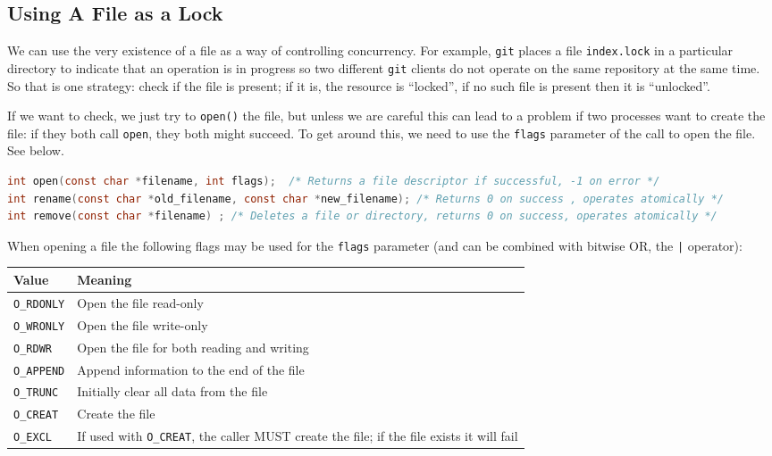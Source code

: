 \subsection*{Using A File as a Lock}

We can use the very existence of a file as a way of controlling concurrency. For example, \texttt{git} places a file \texttt{index.lock} in a particular directory to indicate that an operation is in progress so two different \texttt{git} clients do not operate on the same repository at the same time. So that is one strategy: check if the file is present; if it is, the resource is ``locked'', if no such file is present then it is ``unlocked''.

If we want to check, we just try to \texttt{open()} the file, but unless we are careful this can lead to a problem if two processes want to create the file: if they both call \texttt{open}, they both might succeed. To get around this, we need to use the \texttt{flags} parameter of the call to open the file. See below.

\begin{lstlisting}[language=C]
int open(const char *filename, int flags);  /* Returns a file descriptor if successful, -1 on error */
int rename(const char *old_filename, const char *new_filename); /* Returns 0 on success , operates atomically */
int remove(const char *filename) ; /* Deletes a file or directory, returns 0 on success, operates atomically */ 
\end{lstlisting}

When opening a file the following flags may be used for the \texttt{flags} parameter (and can be combined with bitwise OR, the \texttt{|} operator):

\begin{tabular}{l|l}
	\textbf{Value}     & \textbf{Meaning}                                                                                 \\ \hline
	\texttt{O\_RDONLY} & Open the file read-only                                                                          \\ \hline
	\texttt{O\_WRONLY} & Open the file write-only                                                                         \\ \hline
	\texttt{O\_RDWR}   & Open the file for both reading and writing                                                       \\ \hline
	\texttt{O\_APPEND} & Append information to the end of the file                                                        \\ \hline
	\texttt{O\_TRUNC}  & Initially clear all data from the file                                                           \\ \hline
	\texttt{O\_CREAT}  & Create the file                                                                                  \\ \hline
	\texttt{O\_EXCL}   & If used with \texttt{O\_CREAT}, the caller MUST create the file; if the file exists it will fail \\
\end{tabular}

